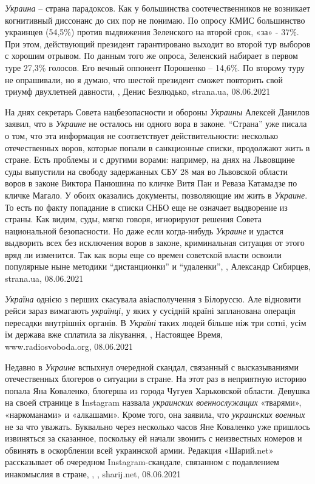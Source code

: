 \emph{Украина} – страна парадоксов. Как у большинства соотечественников не возникает
когнитивный диссонанс до сих пор не понимаю. По опросу КМИС большинство
украинцев (54,5\%) против выдвижения Зеленского на второй срок, «за» - 37\%. При
этом, действующий президент гарантировано выходит во второй тур выборов с
хорошим отрывом. По данным того же опроса, Зеленский набирает в первом туре
27,3\% голосов. Его вечный оппонент Порошенко – 14,6\%. По второму туру не
опрашивали, но я думаю, что шестой президент сможет повторить свой триумф
двухлетней давности,
, Денис Безлюдько, strana.ua, 08.06.2021

На днях секретарь Совета нацбезопасности и обороны \emph{Украины} Алексей Данилов
заявил, что в \emph{Украине} не осталось ни одного вора в законе. \enquote{Страна} уже писала
о том, что эта информация не соответствует действительности: несколько
отечественных воров, которые попали в санкционные списки, продолжают жить в
стране.  Есть проблемы и с другими ворами: например, на днях на Львовщине суды
выпустили на свободу задержанных СБУ 28 мая во Львовской области воров в законе
Виктора Панюшина по кличке Витя Пан и Реваза Катамадзе по кличке Магало. У
обоих оказались документы, позволяющие им жить в \emph{Украине}. То есть по факту
попадание в списки СНБО еще не означает выдворение из страны.  Как видим, суды,
мягко говоря, игнорируют решения Совета национальной безопасности.  Но даже
если когда-нибудь \emph{Украине} и удастся выдворить всех без исключения воров в
законе, криминальная ситуация от этого вряд ли изменится. Так как воры еще со
времен советской власти освоили популярные ныне методики \enquote{дистанционки} и
\enquote{удаленки},
, Александр Сибирцев, strana.ua, 08.06.2021

\emph{Україна} однією з перших скасувала авіасполучення з Білоруссю. Але відновити
рейси зараз вимагають \emph{українці}, у яких у сусідній країні запланована операція
пересадки внутрішніх органів.  В \emph{Україні} таких людей більше ніж три сотні, усім
їм держава вже сплатила за лікування,
, Настоящее Время,
www.radiosvoboda.org, 08.06.2021

Недавно в \emph{Украине} вспыхнул очередной скандал, связанный с высказываниями
отечественных блогеров о ситуации в стране. На этот раз в неприятную историю
попала Яна Коваленко, блогерша из города Чугуев Харьковской области. Девушка на
своей странице в Instagram назвала \emph{украинских военнослужащих} «тварями»,
«наркоманами» и «алкашами». Кроме того, она заявила, что \emph{украинских
военных} не за что уважать.  Буквально через несколько часов Яне Коваленко уже
пришлось извиняться за сказанное, поскольку ей начали звонить с неизвестных
номеров и обвинять в оскорблении всей украинской армии.  Редакция «Шарий.net»
рассказывает об очередном Instagram-скандале, связанном с подавлением
инакомыслия в стране,
, , sharij.net, 08.06.2021

